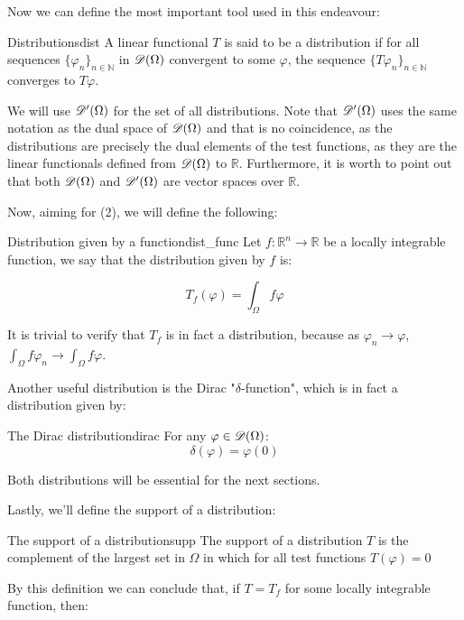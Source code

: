 Now we can define the most important tool used in this endeavour:

\begin{definition}{Distributions}{dist}
    A linear functional $T$ is said to be a distribution if for all sequences $\{\varphi_n\}_{n\in\mathbb{N}}$ in $\mathscr{D}(\Omega)$ convergent to some $\varphi$, the sequence $\{T\varphi_n\}_{n\in\mathbb{N}}$ converges to $T\varphi$.
\end{definition}

We will use $\mathscr{D}'(\Omega)$ for the set of all distributions. Note that $\mathscr{D}'(\Omega)$ uses the same notation as the dual space of $\mathscr{D}(\Omega)$ and that is no coincidence, as the distributions are precisely the dual elements of the test functions, as they are the linear functionals defined from $\mathscr{D}(\Omega)$ to $\mathbb{R}$. Furthermore, it is worth to point out that both $\mathscr{D}(\Omega)$ and $\mathscr{D}'(\Omega)$ are vector spaces over $\mathbb{R}$.

Now, aiming for (2), we will define the following:

\begin{definition}{Distribution given by a function}{dist_func}
    Let $f:\mathbb{R}^n\rightarrow\mathbb{R}$ be a locally integrable function, we say that the distribution given by $f$ is:

    \[T_f(\varphi) = \int_{\Omega}f\varphi\]
    
\end{definition}

It is trivial to verify that $T_f$ is in fact a distribution, because as $\varphi_n\rightarrow\varphi$, $\int_{\Omega}f\varphi_n\rightarrow\int_{\Omega}f\varphi$.

Another useful distribution is the Dirac "$\delta$-function", which is in fact a distribution given by:
\begin{definition}{The Dirac distribution}{dirac}
    For any $\varphi\in\mathscr{D}(\Omega)$:
    \[\delta(\varphi)=\varphi(0)\]
\end{definition}
Both distributions will be essential for the next sections.

Lastly, we'll define the support of a distribution:

\begin{definition}{The support of a distribution}{supp}
    The support of a distribution $T$ is the complement of the largest set in $\Omega$ in which for all test functions $T(\varphi) = 0$
\end{definition}

By this definition we can conclude that, if $T = T_f$ for some locally integrable function, then:

